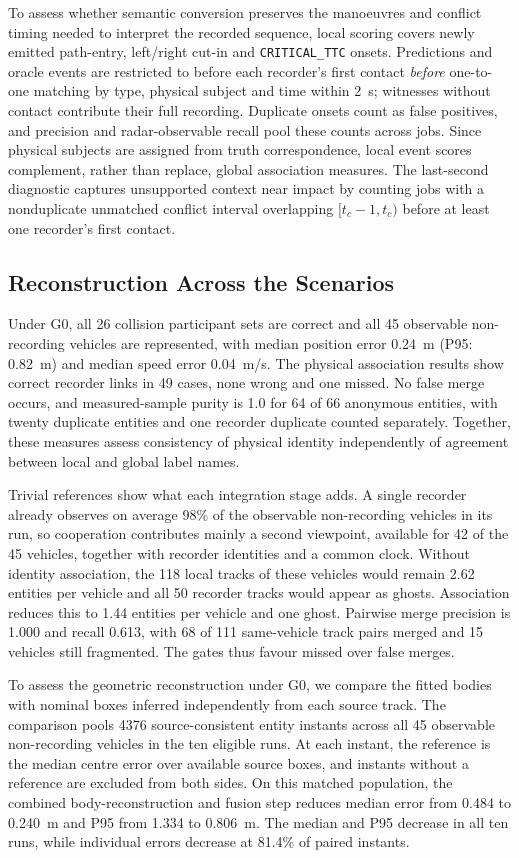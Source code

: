 To assess whether semantic conversion preserves the manoeuvres and
conflict timing needed to interpret the recorded sequence, local scoring
covers newly emitted path-entry, left/right cut-in and
\texttt{CRITICAL\_TTC} onsets. Predictions and oracle events are restricted
to before each recorder's first contact \emph{before} one-to-one matching
by type, physical subject and time within 2~s; witnesses without contact
contribute their full recording. Duplicate onsets count as false
positives, and precision and radar-observable recall pool these counts
across jobs. Since physical subjects are assigned from truth
correspondence, local event scores complement, rather than replace,
global association measures. The last-second diagnostic captures
unsupported context near impact by counting jobs with a nonduplicate
unmatched conflict interval overlapping $[t_c-1,t_c)$ before at least one
recorder's first contact.

\subsection{Reconstruction Across the Scenarios}
\label{subsec:exact}
Under G0, all 26 collision participant sets are correct and all 45
observable non-recording vehicles are represented, with median position
error 0.24~m (P95: 0.82~m) and median speed error 0.04~m/s. The physical
association results show correct recorder links in 49 cases, none wrong
and one missed. No false merge occurs, and measured-sample purity is 1.0
for 64 of 66 anonymous entities, with twenty duplicate entities and one
recorder duplicate counted separately. Together, these measures assess
consistency of physical identity independently of agreement between
local and global label names.

Trivial references show what each integration stage adds. A single
recorder already observes on average 98\% of the observable
non-recording vehicles in its run, so cooperation contributes mainly a
second viewpoint, available for 42 of the 45 vehicles, together with
recorder identities and a common clock. Without identity association,
the 118 local tracks of these vehicles would remain 2.62 entities per
vehicle and all 50 recorder tracks would appear as ghosts. Association
reduces this to 1.44 entities per vehicle and one ghost. Pairwise merge
precision is 1.000 and recall 0.613, with 68 of 111 same-vehicle track
pairs merged and 15 vehicles still fragmented. The gates thus favour
missed over false merges.

To assess the geometric reconstruction under G0, we compare the fitted
bodies with nominal boxes inferred independently from each source track.
The comparison pools 4376 source-consistent entity instants
across all 45 observable non-recording vehicles in the ten eligible runs.
At each instant, the reference is the median centre error over available
source boxes, and instants without a reference are excluded from both
sides. On this matched population, the combined body-reconstruction and
fusion step reduces median error from 0.484 to 0.240~m and P95 from
1.334 to 0.806~m. The median and P95 decrease in all ten runs, while
individual errors decrease at 81.4\% of paired instants.

